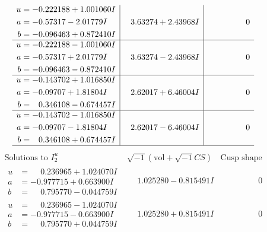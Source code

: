 \documentclass[1p]{elsarticle_modified}
\theoremstyle{definition}
\newcommand{\I}{\sqrt{-1}}
\begin{document}
$$\begin{array}{c|c|c}
\begin{aligned}
u &= -0.222188 + 1.001060 I \\
a &= -0.57317 - 2.01779 I \\
b &= -0.096463 + 0.872410 I\end{aligned}
 & \phantom{-}3.63274 + 2.43968 I & \phantom{-0.000000 } 0 \\ \hline\begin{aligned}
u &= -0.222188 - 1.001060 I \\
a &= -0.57317 + 2.01779 I \\
b &= -0.096463 - 0.872410 I\end{aligned}
 & \phantom{-}3.63274 - 2.43968 I & \phantom{-0.000000 } 0 \\ \hline\begin{aligned}
u &= -0.143702 + 1.016850 I \\
a &= -0.09707 + 1.81804 I \\
b &= \phantom{-}0.346108 - 0.674457 I\end{aligned}
 & \phantom{-}2.62017 + 6.46004 I & \phantom{-0.000000 } 0 \\ \hline\begin{aligned}
u &= -0.143702 - 1.016850 I \\
a &= -0.09707 - 1.81804 I \\
b &= \phantom{-}0.346108 + 0.674457 I\end{aligned}
 & \phantom{-}2.62017 - 6.46004 I & \phantom{-0.000000 } 0\\
 \hline 
 \end{array}$$\newpage$$\begin{array}{c|c|c}  
\text{Solutions to }I^u_{2}& \I (\text{vol} + \sqrt{-1}CS) & \text{Cusp shape}\\
 \hline 
\begin{aligned}
u &= \phantom{-}0.236965 + 1.024070 I \\
a &= -0.977715 + 0.663900 I \\
b &= \phantom{-}0.795770 - 0.044759 I\end{aligned}
 & \phantom{-}1.025280 - 0.815491 I & \phantom{-0.000000 } 0 \\ \hline\begin{aligned}
u &= \phantom{-}0.236965 - 1.024070 I \\
a &= -0.977715 - 0.663900 I \\
b &= \phantom{-}0.795770 + 0.044759 I\end{aligned}
 & \phantom{-}1.025280 + 0.815491 I & \phantom{-0.000000 } 0 \\ \hline\begin{aligned}

\end{aligned}
\end{array}$$
\end{document}
